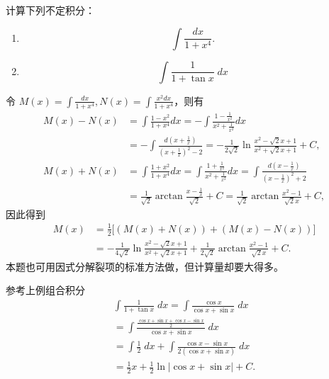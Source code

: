 \documentclass[lang=cn,12pt]{elegantbook}
\begin{document}
\begin{example}
    计算下列不定积分：
    \begin{enumerate}
        \item \[
    \int \frac{dx}{1 + x^4}.
    \]
        \item \[
    \int \frac{1}{1 + \tan x} \; dx
    \]
    \end{enumerate}
    
\end{example}

\begin{solution}
    令 \( M(x) = \int \frac{dx}{1+x^4}, N(x) = \int \frac{x^2 dx}{1+x^4} \)，则有
    \[
    \begin{aligned}
    M(x) - N(x) &= \int \frac{1-x^2}{1+x^4} dx = -\int \frac{1-\frac{1}{x^2}}{x^2+\frac{1}{x^2}} dx \\
    &= -\int \frac{d\left(x+\frac{1}{x}\right)}{\left(x+\frac{1}{x}\right)^2-2} = -\frac{1}{2\sqrt{2}}\ln\frac{x^2-\sqrt{2}x+1}{x^2+\sqrt{2}x+1} + C, \\
    M(x) + N(x) &= \int \frac{1+x^2}{1+x^4} dx = \int \frac{1+\frac{1}{x^2}}{x^2+\frac{1}{x^2}} dx = \int \frac{d\left(x-\frac{1}{x}\right)}{\left(x-\frac{1}{x}\right)^2+2} \\
    &= \frac{1}{\sqrt{2}}\arctan\frac{x-\frac{1}{x}}{\sqrt{2}} + C = \frac{1}{\sqrt{2}}\arctan\frac{x^2-1}{\sqrt{2}x} + C,
    \end{aligned}
    \]
    因此得到
    \[
    \begin{aligned}
    M(x) &= \frac{1}{2}\bigl[(M(x) + N(x)) + (M(x) - N(x))\bigr] \\
    &= -\frac{1}{4\sqrt{2}}\ln\frac{x^2-\sqrt{2}x+1}{x^2+\sqrt{2}x+1} + \frac{1}{2\sqrt{2}}\arctan\frac{x^2-1}{\sqrt{2}x} + C.
    \end{aligned}
    \]
    本题也可用因式分解裂项的标准方法做，但计算量却要大得多。
\end{solution}

\begin{solution}
    参考上例组合积分 
    \[
    \begin{aligned}
        \int \frac{1}{1 + \tan x} \; dx = \int \frac{\cos x}{\cos x + \sin x} \; dx \\
        = \int \frac{\frac{\cos x + \sin x  + \cos x- \sin x }{2}}{\cos x + \sin x} \; dx\\
        = \int \frac{1}{2} \; dx + \int \frac{\cos x - \sin x}{2(\cos x + \sin x)} \; dx\\
        = \frac{1}{2}x + \frac{1}{2}\ln|\cos x + \sin x| + C.
    \end{aligned}
    \]
\end{solution}
\end{document}
